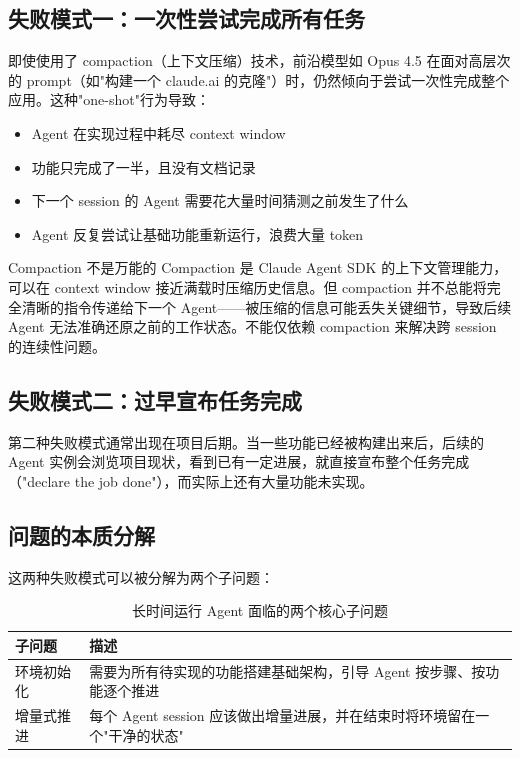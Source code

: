 \documentclass[a4paper]{article}
\begin{document}
\subsection{失败模式一：一次性尝试完成所有任务}

即使使用了 compaction（上下文压缩）技术，前沿模型如 Opus 4.5 在面对高层次的 prompt（如"构建一个 claude.ai 的克隆"）时，仍然倾向于尝试一次性完成整个应用。这种"one-shot"行为导致：

\begin{itemize}
    \item Agent 在实现过程中耗尽 context window
    \item 功能只完成了一半，且没有文档记录
    \item 下一个 session 的 Agent 需要花大量时间猜测之前发生了什么
    \item Agent 反复尝试让基础功能重新运行，浪费大量 token
\end{itemize}

\begin{warningbox}{Compaction 不是万能的}
Compaction 是 Claude Agent SDK 的上下文管理能力，可以在 context window 接近满载时压缩历史信息。但 compaction 并不总能将完全清晰的指令传递给下一个 Agent——被压缩的信息可能丢失关键细节，导致后续 Agent 无法准确还原之前的工作状态。不能仅依赖 compaction 来解决跨 session 的连续性问题。
\end{warningbox}

\subsection{失败模式二：过早宣布任务完成}

第二种失败模式通常出现在项目后期。当一些功能已经被构建出来后，后续的 Agent 实例会浏览项目现状，看到已有一定进展，就直接宣布整个任务完成（"declare the job done"），而实际上还有大量功能未实现。

\subsection{问题的本质分解}

这两种失败模式可以被分解为两个子问题：

\begin{table}[H]
\centering
\begin{tabular}{p{4cm}p{9cm}}
\toprule
\textbf{子问题} & \textbf{描述} \\
\midrule
环境初始化 & 需要为所有待实现的功能搭建基础架构，引导 Agent 按步骤、按功能逐个推进 \\
\midrule
增量式推进 & 每个 Agent session 应该做出增量进展，并在结束时将环境留在一个"干净的状态" \\
\bottomrule
\end{tabular}
\caption{长时间运行 Agent 面临的两个核心子问题}
\end{table}
\end{document}

